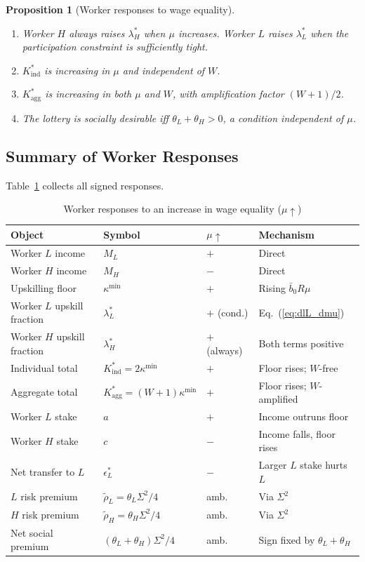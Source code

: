 \documentclass[12pt,a4paper]{article}
\newtheorem{proposition}{Proposition}
\begin{document}
\begin{proposition}[Worker responses to wage equality]
\label{prop:worker_responses}
\begin{enumerate}
  \item Worker $H$ always raises $\lambda_H^*$ when $\mu$ increases.
        Worker $L$ raises $\lambda_L^*$ when the participation
        constraint is sufficiently tight.
  \item $K^*_{\mathrm{ind}}$ is increasing in $\mu$ and independent
        of $W$.
  \item $K^*_{\mathrm{agg}}$ is increasing in both $\mu$ and $W$,
        with amplification factor $(W+1)/2$.
  \item The lottery is socially desirable iff $\theta_L + \theta_H > 0$,
        a condition independent of $\mu$.
\end{enumerate}
\end{proposition}

\subsection{Summary of Worker Responses}

Table~\ref{tab:worker_responses} collects all signed responses.

\begin{table}[h!]
\centering
\caption{Worker responses to an increase in wage equality ($\mu\uparrow$)}
\label{tab:worker_responses}
\renewcommand{\arraystretch}{1.2}
\begin{tabular}{lllp{5.5cm}}
\toprule
Object & Symbol & $\mu\uparrow$ & Mechanism \\
\midrule
Worker $L$ income & $M_L$ & $+$ & Direct \\
Worker $H$ income & $M_H$ & $-$ & Direct \\
Upskilling floor & $\kappa^{\min}$ & $+$ & Rising $\bar{b}_0 R\mu$ \\
Worker $L$ upskill fraction & $\lambda_L^*$ & $+$ (cond.) & Eq.~(\ref{eq:dlL_dmu}) \\
Worker $H$ upskill fraction & $\lambda_H^*$ & $+$ (always) & Both terms positive \\
Individual total & $K^*_{\mathrm{ind}}=2\kappa^{\min}$ & $+$ & Floor rises; $W$-free \\
Aggregate total & $K^*_{\mathrm{agg}}=(W{+}1)\kappa^{\min}$ & $+$ & Floor rises; $W$-amplified \\
Worker $L$ stake & $a$ & $+$ & Income outruns floor \\
Worker $H$ stake & $c$ & $-$ & Income falls, floor rises \\
Net transfer to $L$ & $\epsilon_L^*$ & $-$ & Larger $L$ stake hurts $L$ \\
$L$ risk premium & $\tilde\rho_L = \theta_L\Sigma^2/4$ & amb. & Via $\Sigma^2$ \\
$H$ risk premium & $\tilde\rho_H = \theta_H\Sigma^2/4$ & amb. & Via $\Sigma^2$ \\
Net social premium & $(\theta_L{+}\theta_H)\Sigma^2/4$ & amb. & Sign fixed by $\theta_L{+}\theta_H$ \\
\bottomrule
\end{tabular}
\end{table}
\end{document}
